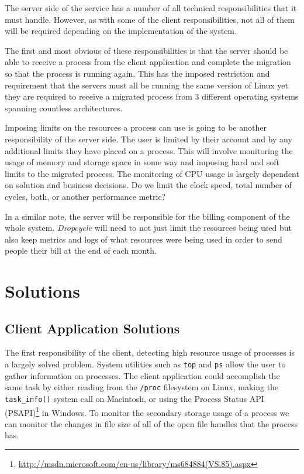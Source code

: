 \documentclass[12pt, a4paper]{article}
\begin{document}
The server side of the service has a number of all technical responsibilities
that it must handle. However, as with some of the client responsibilities, not
all of them will be required depending on the implementation of the system.

The first and most obvious of these responsibilities is that the server should
be able to receive a process from the client application and complete the
migration so that the process is running again. This has the imposed restriction
and requirement that the servers must all be running the same version of Linux
yet they are required to receive a migrated process from 3 different operating
systems spanning countless architectures.

Imposing limits on the resources a process can use is going to be another
responsibility of the server side. The user is limited by their account and
by any additional limits they have placed on a process. This will involve
monitoring the usage of memory and storage space in some way and imposing hard
and soft limits to the migrated process. The monitoring of CPU usage is largely
dependent on solution and business decisions. Do we limit the clock speed, total
number of cycles, both, or another performance metric?

In a similar note, the server will be responsible for the billing component of
the whole system. \emph{Dropcycle} will need to not just limit the resources
being used but also keep metrics and logs of what resources were being used in
order to send people their bill at the end of each month.


\section{Solutions}

\subsection{Client Application Solutions}

The first responsibility of the client, detecting high resource usage of
processes is a largely solved problem. System utilities such as \texttt{top}
and \texttt{ps} allow the user to gather information on processes. The client
application could accomplish the same task by either reading from the
\texttt{/proc} filesystem on Linux, making the \texttt{task\_info()} system
call on Macintosh, or using the Process Status API
(PSAPI)\footnote{\url{http://msdn.microsoft.com/en-us/library/ms684884(VS.85).aspx}}
in Windows. To monitor the secondary storage usage of a process we can monitor
the changes in file size of all of the open file handles that the process has.
\end{document}
